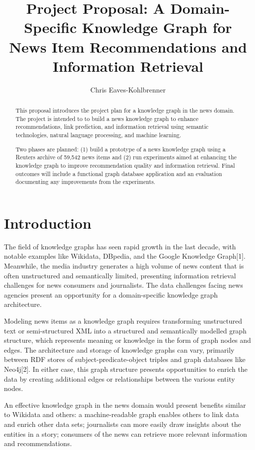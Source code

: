 \documentclass[11pt]{article}   	%
\title{Project Proposal: A Domain-Specific Knowledge Graph for News Item Recommendations and Information Retrieval}
\author{Chris Eaves-Kohlbrenner}
\begin{document}
\maketitle

\begin{abstract}
This proposal introduces the project plan for a knowledge graph in the news domain. The project is intended to to build a news knowledge graph to enhance recommendations, link prediction, and information retrieval using semantic technologies, natural language processing, and machine learning.

Two phases are planned: (1) build a prototype of a news knowledge graph using a Reuters archive of 59,542 news items and (2) run experiments aimed at enhancing the knowledge graph to improve recommendation quality and information retrieval. Final outcomes will include a functional graph database application and an evaluation documenting any improvements from the experiments.
\end{abstract}

\newpage
\tableofcontents

\newpage
\section{Introduction}
The field of knowledge graphs has seen rapid growth in the last decade, with notable examples like Wikidata, DBpedia, and the Google Knowledge Graph[1]. Meanwhile, the media industry generates a high volume of news content that is often unstructured and semantically limited, presenting information retrieval challenges for news consumers and journalists. The data challenges facing news agencies present an opportunity for a domain-specific knowledge graph architecture. 

Modeling news items as a knowledge graph requires transforming unstructured text or semi-structured XML into a structured and semantically modelled graph structure, which represents meaning or knowledge in the form of graph nodes and edges. The architecture and storage of knowledge graphs can vary, primarily between RDF stores of subject-predicate-object triples and graph databases like Neo4j[2]. In either case, this graph structure presents opportunities to enrich the data by creating additional edges or relationships between the various entity nodes.

An effective knowledge graph in the news domain would present benefits similar to Wikidata and others: a machine-readable graph enables others to link data and enrich other data sets; journalists can more easily draw insights about the entities in a story; consumers of the news can retrieve more relevant information and recommendations.
\end{document}
